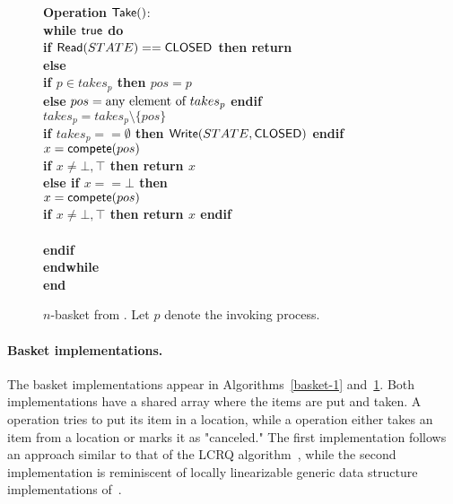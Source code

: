 \begin{figure}[H]
{{\begin{minipage}[t]{180mm}
\begin{tabbing}
{\bf Operation} ${\sf \small Take}()$: \\
 \> {\bf while \({\sf \small true}\) do}\\
 \> \> {\bf if \({\sf \small Read}(STATE) == {\sf \small CLOSED}\) then return \closed} \\
 \> \> {\bf else} \\
 \> \> \> {\bf if \(p \in takes_p\) then \(pos = p\)} \\
 \> \> \> {\bf else} \(pos = \hbox{any element of } takes_p\) {\bf endif} \\
 \> \> \> \(takes_p =  takes_p \setminus \{pos\}\) \\
 \> \> \> {\bf if \(takes_p == \emptyset\) then \({\sf \small Write}(STATE, {\sf \small CLOSED})\) endif} \\
 \> \> \> \( x = {\sf \small compete}(pos) \) \\
 \> \> \> {\bf if \(x \neq \bot, \top \) then return \(x\)} \\
 \> \> \> {\bf else if \(x == \bot\) then} \\
 \> \> \> \> \( x = {\sf \small compete}(pos) \) \\
 \> \> \> \> {\bf if \(x \neq \bot, \top \) then return \(x\) endif} \\
 \> \>  \\
 \> \> {\bf endif} \\
 \> {\bf endwhile}\\
{\bf end \Take}
\end{tabbing}
\end{minipage}}
\caption{\label{basket-2}$n$-basket from \CAS. Let $p$ denote the invoking process.}
}
\end{figure}

\paragraph{Basket implementations.}
The basket implementations appear in Algorithms~\ref{basket-1} and~\ref{basket-2}.  Both implementations have a shared array where the items are put and taken.  A \Put operation tries to put its item in a location, while a \Take operation either takes an item from a location or marks it as "canceled."  The first implementation follows an approach similar to that of the LCRQ algorithm~\cite{ppopp2013x86queues}, while the second implementation is reminiscent of locally linearizable generic data structure implementations of~\cite{DBLP_conf_concur_HaasHHKLPSSV16}.

